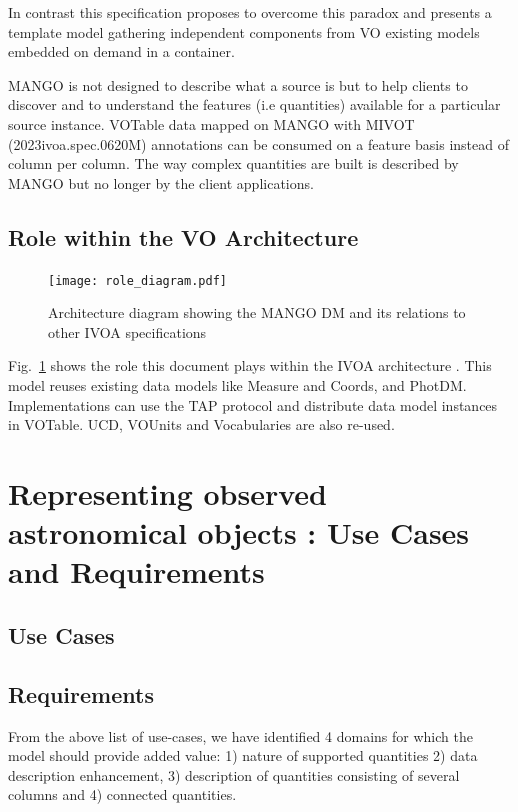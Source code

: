 \documentclass[11pt,a4paper]{ivoa}
\begin{document}
In contrast this specification proposes to overcome this paradox and presents a template model gathering independent
components from VO existing models embedded on demand in a container.

MANGO is not designed to describe what a source is but to help clients to discover and to understand
the features (i.e quantities) available for a particular source instance.
VOTable data mapped on MANGO with MIVOT (2023ivoa.spec.0620M) annotations can be consumed on a feature basis 
instead of column per column.
The way complex quantities are built is described by MANGO but no longer by the client applications.

\subsection{Role within the VO Architecture}

\begin{figure}
\centering

\texttt{[image: role\_diagram.pdf]}
\caption{Architecture diagram showing the MANGO DM and its relations to other IVOA specifications}
\label{fig:archdiag}
\end{figure}

Fig.~\ref{fig:archdiag} shows the role this document plays within the
IVOA architecture \citep{2010ivoa.rept.1123A}. This model reuses existing data models like Measure and Coords, and PhotDM. Implementations can use the TAP protocol and distribute data model instances in VOTable. 
UCD, VOUnits and Vocabularies are also re-used.  

\section{Representing observed astronomical objects : Use Cases and  Requirements}

\subsection{Use Cases}


\subsection{Requirements}

From the above list of use-cases, we have identified 4 domains for which
the model should provide added value: 1) nature of supported quantities 2) data description enhancement,
3) description of quantities consisting of several columns and 4) connected quantities.
\end{document}
